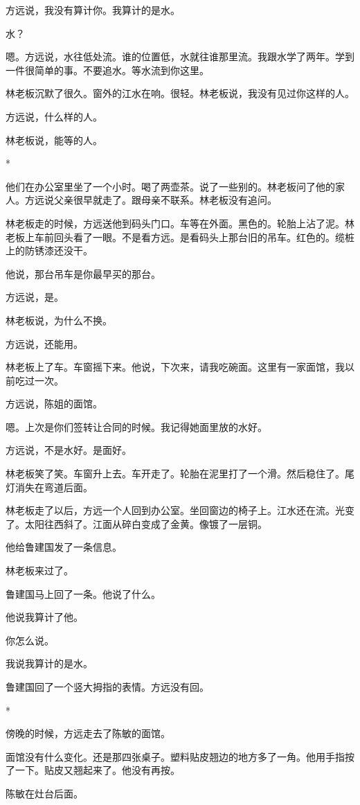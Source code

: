 \documentclass[UTF8,a5paper,11pt,openany]{ctexbook}
\newcommand{\scene}{\vspace{1em}\begin{center}*\quad*\quad*\end{center}\vspace{0.5em}}
\begin{document}
方远说，我没有算计你。我算计的是水。

水？

嗯。方远说，水往低处流。谁的位置低，水就往谁那里流。我跟水学了两年。学到一件很简单的事。不要追水。等水流到你这里。

林老板沉默了很久。窗外的江水在响。很轻。林老板说，我没有见过你这样的人。

方远说，什么样的人。

林老板说，能等的人。


\scene

他们在办公室里坐了一个小时。喝了两壶茶。说了一些别的。林老板问了他的家人。方远说父亲很早就走了。跟母亲不联系。林老板没有追问。

林老板走的时候，方远送他到码头门口。车等在外面。黑色的。轮胎上沾了泥。林老板上车前回头看了一眼。不是看方远。是看码头上那台旧的吊车。红色的。缆桩上的防锈漆还没干。

他说，那台吊车是你最早买的那台。

方远说，是。

林老板说，为什么不换。

方远说，还能用。

林老板上了车。车窗摇下来。他说，下次来，请我吃碗面。这里有一家面馆，我以前吃过一次。

方远说，陈姐的面馆。

嗯。上次是你们签转让合同的时候。我记得她面里放的水好。

方远说，不是水好。是面好。

林老板笑了笑。车窗升上去。车开走了。轮胎在泥里打了一个滑。然后稳住了。尾灯消失在弯道后面。

林老板走了以后，方远一个人回到办公室。坐回窗边的椅子上。江水还在流。光变了。太阳往西斜了。江面从碎白变成了金黄。像镀了一层铜。

他给鲁建国发了一条信息。

林老板来过了。

鲁建国马上回了一条。他说了什么。

他说我算计了他。

你怎么说。

我说我算计的是水。

鲁建国回了一个竖大拇指的表情。方远没有回。


\scene

傍晚的时候，方远走去了陈敏的面馆。

面馆没有什么变化。还是那四张桌子。塑料贴皮翘边的地方多了一角。他用手指按了一下。贴皮又翘起来了。他没有再按。

陈敏在灶台后面。
\end{document}
